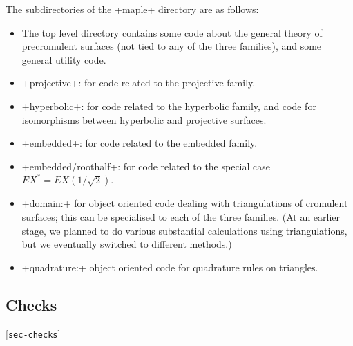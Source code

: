\documentclass[reqno]{amsart}
\newcommand{\lbl}[1]{\label{#1}\textup{[\texttt{#1}]}\par}
\newcommand{\lbl}{\label}
\newcommand{\rt}        {\sqrt{2}}
\renewcommand{\:}{\colon}
\theoremstyle{definition}
\begin{document}
The subdirectories of the \fname+maple+ directory are as follows:
\begin{itemize}
 \item The top level directory contains some code about the general
  theory of precromulent surfaces (not tied to any of the three
  families), and some general utility code.
 \item \fname+projective+: for code related to the projective family.
 \item \fname+hyperbolic+: for code related to the hyperbolic family,
  and code for isomorphisms between hyperbolic and projective surfaces.
 \item \fname+embedded+: for code related to the embedded family.
 \item \fname+embedded/roothalf+: for code related to the special case
  $EX^*=EX(1/\rt)$.
 \item \fname+domain:+ for object oriented code dealing with
  triangulations of cromulent surfaces; this can be specialised to
  each of the three families.  (At an earlier stage, we planned to do
  various substantial calculations using triangulations, but we
  eventually switched to different methods.)
 \item \fname+quadrature:+ object oriented code for quadrature rules
  on triangles.
\end{itemize}

\subsection{Checks}
\lbl{sec-checks}
\end{document}
